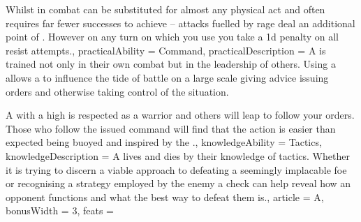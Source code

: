 {Whilst in combat\comma{}  can be substituted for almost any physical act\comma{} and often requires far fewer successes to achieve – attacks fuelled by rage deal an additional point of . However\comma{} on any turn on which you use \comma{} you take a 1d penalty on all resist attempts.,
	practicalAbility = Command,
	practicalDescription = A \bname{} is trained not only in their own combat\comma{} but in the leadership of others. Using a  allows a \bname{} to influence the tide of battle on a large scale\comma{} giving advice\comma{} issuing orders and otherwise taking control of the situation. 

A \bname{} with a high  is respected as a warrior\comma{} and others will leap to follow your orders. Those who follow the issued command will find that the action is easier than expected\comma{} being buoyed and inspired by the .,
	knowledgeAbility = Tactics,
	knowledgeDescription = A \bname{} lives and dies by their knowledge of tactics. Whether it is trying to discern a viable approach to defeating a seemingly implacable foe\comma{} or recognising a strategy employed by the enemy\comma{} a  check can help reveal how an opponent functions\comma{} and what the best way to defeat them is.,
	article = A,
	bonusWidth = 3, feats = \WarriorFeats
}



